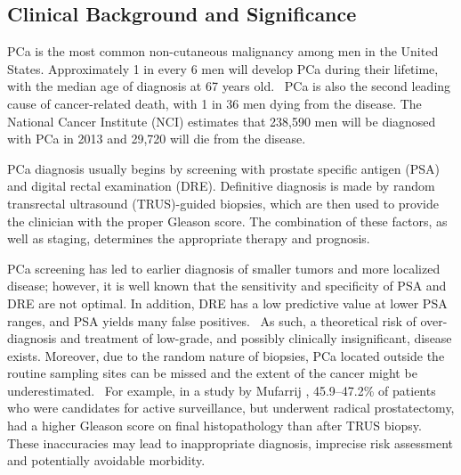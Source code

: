 ﻿\subsection{Clinical Background and Significance}
PCa is the most common non-cutaneous malignancy among men in the United States.
Approximately 1 in every 6 men will develop PCa during their lifetime, with the
median age of diagnosis at 67 years old.~\cite{Howlader2011} PCa is also the
second leading cause of cancer-related death, with 1 in 36 men dying from the
disease.  The National Cancer Institute (NCI) estimates that 238,590 men will
be diagnosed with PCa in 2013 and 29,720 will die from the
disease.~\cite{Howlader2011}

PCa diagnosis usually begins by screening with prostate specific antigen (PSA)
and digital rectal examination (DRE).  Definitive diagnosis is made by random
transrectal ultrasound (TRUS)-guided biopsies, which are then used to provide
the clinician with the proper Gleason score. The combination of these factors,
as well as staging, determines the appropriate therapy and prognosis. 

PCa screening has led to earlier diagnosis of smaller tumors and more localized
disease; however, it is well known that the sensitivity and specificity of PSA
and DRE are not optimal. In addition, DRE has a low predictive value at lower
PSA ranges, and PSA yields many false
positives.~\cite{Gosselaar2007,Gupta2013,Hricak2007} As such, a theoretical
risk of over-diagnosis and treatment of low-grade, and possibly clinically
insignificant, disease exists.  Moreover, due to the random nature of biopsies,
PCa located outside the routine sampling sites can be missed and the extent
of the cancer might be underestimated.~\cite{Gupta2013,Cornud2012} For example,
in a study by Mufarrij \etal, 45.9--47.2\% of patients who were candidates for
active surveillance, but underwent radical prostatectomy, had a higher Gleason
score on final histopathology than after TRUS biopsy.~\cite{Mufarrij2010} These
inaccuracies may lead to inappropriate diagnosis, imprecise risk assessment and
potentially avoidable morbidity.

